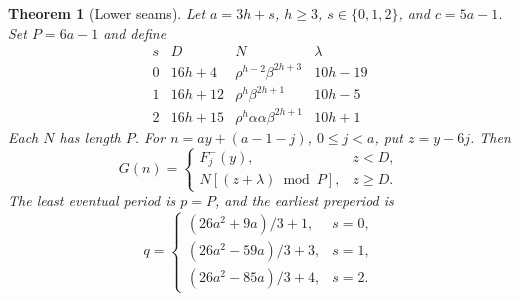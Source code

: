 \documentclass[11pt]{article}
\newtheorem{theorem}{Theorem}[section]
\theoremstyle{remark}\newtheorem{remark}[theorem]{Remark}
\begin{document}
\begin{theorem}[Lower seams]\label{thm:lower-seam}
Let $a=3h+s$, $h\ge3$, $s\in\{0,1,2\}$, and $c=5a-1$.
Set $P=6a-1$ and define
\begin{equation}\label{eq:lower-seam-data}
\begin{array}{c|c|c|c}
s&D&N&\lambda\\\hline
0&16h+4&\rho^{h-2}\beta^{2h+3}&10h-19\\
1&16h+12&\rho^h\beta^{2h+1}&10h-5\\
2&16h+15&\rho^h\alpha\alpha\beta^{2h+1}&10h+1
\end{array}
\end{equation}
Each $N$ has length $P$. For $n=ay+(a-1-j)$, $0\le j<a$, put
$z=y-6j$. Then
\[
 G(n)=\begin{cases}
 F^-_j(y),&z<D,\\
 N[(z+\lambda)\bmod P],&z\ge D.
 \end{cases}
\]
The least eventual period is $p=P$, and the earliest preperiod is
\begin{equation}\label{eq:lower-seam-q}
q=\begin{cases}
 (26a^2+9a)/3+1,&s=0,\\
 (26a^2-59a)/3+3,&s=1,\\
 (26a^2-85a)/3+4,&s=2.
\end{cases}
\end{equation}
\end{theorem}
\end{document}
